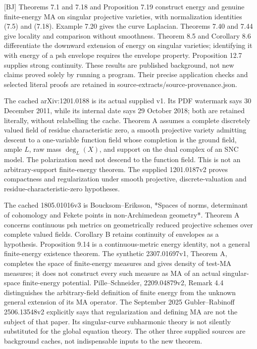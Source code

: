 \documentclass[11pt]{article}
\begin{document}
[BJ] Theorems 7.1 and 7.18 and Proposition 7.19 construct energy and genuine finite-energy MA on singular projective varieties, with normalization identities (7.5) and (7.18). Example 7.20 gives the curve Laplacian. Theorems 7.40 and 7.44 give locality and comparison without smoothness. Theorem 8.5 and Corollary 8.6 differentiate the downward extension of energy on singular varieties; identifying it with energy of a psh envelope requires the envelope property. Proposition 12.7 supplies strong continuity. These results are published background, not new claims proved solely by running a program. Their precise application checks and selected literal proofs are retained in source-extracts/source-provenance.json.

The cached arXiv:1201.0188 is its actual supplied v1. Its PDF watermark says 30 December 2011, while its internal date says 29 October 2018; both are retained literally, without relabelling the cache. Theorem A assumes a complete discretely valued field of residue characteristic zero, a smooth projective variety admitting descent to a one-variable function field whose completion is the ground field, ample $L$, raw mass $\deg_L(X)$, and support on the dual complex of an SNC model. The polarization need not descend to the function field. This is not an arbitrary-support finite-energy theorem. The supplied 1201.0187v2 proves compactness and regularization under smooth projective, discrete-valuation and residue-characteristic-zero hypotheses.

The cached 1805.01016v3 is Boucksom--Eriksson, *Spaces of norms, determinant of cohomology and Fekete points in non-Archimedean geometry*. Theorem A concerns continuous psh metrics on geometrically reduced projective schemes over complete valued fields. Corollary B retains continuity of envelopes as a hypothesis. Proposition 9.14 is a continuous-metric energy identity, not a general finite-energy existence theorem. The synthetic 2307.01697v1, Theorem A, completes the space of finite-energy measures and gives density of test-MA measures; it does not construct every such measure as MA of an actual singular-space finite-energy potential. Pille--Schneider, 2209.04879v2, Remark 4.4 distinguishes the arbitrary-field definition of finite energy from the unknown general extension of its MA operator. The September 2025 Gubler--Rabinoff 2506.13548v2 explicitly says that regularization and defining MA are not the subject of that paper. Its singular-curve subharmonic theory is not silently substituted for the global equation theory. The other three supplied sources are background caches, not indispensable inputs to the new theorem.
\end{document}
